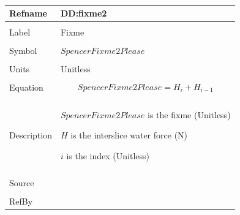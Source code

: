 \documentclass[12pt]{article}
\begin{document}
~\newline
 \noindent \begin{minipage}{\textwidth}
\begin{tabular}{p{} p{}}
\toprule \textbf{Refname} & \textbf{DD:fixme2}
\label{DD:fixme2}
\\ \midrule \\
Label & Fixme
        \\ \midrule \\
        Symbol & $SpencerFixme2Please$
                 \\ \midrule \\
                 Units & Unitless
                         \\ \midrule \\
                         Equation & \begin{dmath}
                                    SpencerFixme2Please=H_{i}+H_{i-1}
                                    \end{dmath}
                                    \\ \midrule \\
                                    Description & \begin{symbDescription}
                                                  \item{$SpencerFixme2Please$ is the fixme (Unitless)}
                                                  \item{$H$ is the interslice water force (N)}
                                                  \item{$i$ is the index (Unitless)}
                                                  \end{symbDescription}
                                                  \\ \midrule \\
                                                  Source & \\ \midrule \\
                                                           RefBy & 
\\ \bottomrule \end{tabular}
\end{minipage}\\
\end{document}

